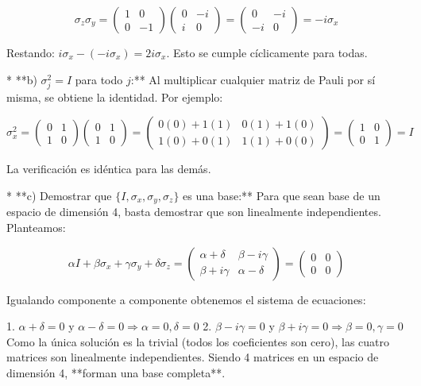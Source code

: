 \documentclass[11pt,spanish]{article}
\begin{document}
$$\sigma_z\sigma_y = \begin{pmatrix}1&0\\0&-1\end{pmatrix}\begin{pmatrix}0&-i\\i&0\end{pmatrix} = \begin{pmatrix}0&-i\\-i&0\end{pmatrix} = -i\sigma_x$$



Restando: $i\sigma_x - (-i\sigma_x) = 2i\sigma_x$. Esto se cumple cíclicamente para todas.


* **b) $\sigma_{j}^{2}=I$ para todo $j$:**
Al multiplicar cualquier matriz de Pauli por sí misma, se obtiene la identidad. Por ejemplo:



$$\sigma_x^2 = \begin{pmatrix}0&1\\1&0\end{pmatrix}\begin{pmatrix}0&1\\1&0\end{pmatrix} = \begin{pmatrix}0(0)+1(1) & 0(1)+1(0) \\ 1(0)+0(1) & 1(1)+0(0)\end{pmatrix} = \begin{pmatrix}1&0\\0&1\end{pmatrix} = I$$



La verificación es idéntica para las demás.


* **c) Demostrar que $\{I,\sigma_{x},\sigma_{y},\sigma_{z}\}$ es una base:**
Para que sean base de un espacio de dimensión 4, basta demostrar que son linealmente independientes. Planteamos:



$$\alpha I + \beta\sigma_x + \gamma\sigma_y + \delta\sigma_z = \begin{pmatrix} \alpha+\delta & \beta-i\gamma \\ \beta+i\gamma & \alpha-\delta \end{pmatrix} = \begin{pmatrix} 0 & 0 \\ 0 & 0 \end{pmatrix}$$



Igualando componente a componente obtenemos el sistema de ecuaciones:


1. $\alpha + \delta = 0$ y $\alpha - \delta = 0 \Rightarrow \alpha = 0, \delta = 0$
2. $\beta - i\gamma = 0$ y $\beta + i\gamma = 0 \Rightarrow \beta = 0, \gamma = 0$
Como la única solución es la trivial (todos los coeficientes son cero), las cuatro matrices son linealmente independientes. Siendo 4 matrices en un espacio de dimensión 4, **forman una base completa**.
\end{document}
